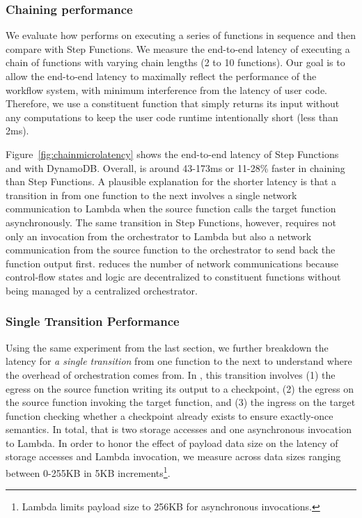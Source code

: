 \subsubsection{Chaining performance}\label{sec:eval:chain}

We evaluate how \name{} performs on executing a series of functions in
sequence and then compare with Step Functions. We measure the end-to-end
latency of executing a chain of functions with varying chain lengths (2 to 10
functions). Our goal is to allow the end-to-end latency to maximally reflect
the performance of the workflow system, with minimum interference from the
latency of user code. Therefore, we use a constituent function that simply
returns its input without any computations to keep the user code runtime
intentionally short (less than 2ms).

Figure~\ref{fig:chainmicrolatency} shows the end-to-end latency of Step
Functions and \name{} with DynamoDB. Overall, \name{} is around 43-173ms or
11-28\% faster in chaining than Step Functions. A plausible explanation for
the shorter latency is that a transition in \name{} from one function to the
next involves a single network communication to Lambda when the source
function calls the target function asynchronously. The same transition in Step
Functions, however, requires not only an invocation from the orchestrator to
Lambda but also a network communication from the source function to the
orchestrator to send back the function output first. \name{} reduces
the number of network communications because control-flow states and logic are
decentralized to constituent functions without being managed by a centralized
orchestrator.

\subsubsection{Single Transition Performance}

Using the same experiment from the last section, we further breakdown the
latency for \emph{a single transition} from one function to the next to
understand where the overhead of orchestration comes from. In \name{}, this
transition involves (1) the egress on the source function writing its output
to a checkpoint, (2) the egress on the source function invoking the target
function, and (3) the ingress on the target function checking whether a
checkpoint already exists to ensure exactly-once semantics. In total, that is
two storage accesses and one asynchronous invocation to Lambda. In order to
honor the effect of payload data size on the latency of storage accesses and
Lambda invocation, we measure across data sizes ranging between 0-255KB in 5KB
increments\footnote{Lambda limits payload size to 256KB for asynchronous
invocations.}.

